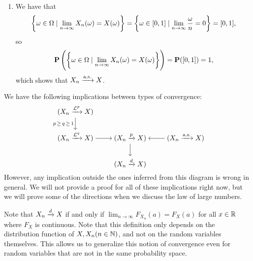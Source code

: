 \documentclass[11pt,a4paper]{article}
\newcommand{\as}{\text{a.s.}}
\begin{document}
\begin{example}
\begin{enumerate}
\begin{multline*}
        \lim_{n \to \infty} \E[|X_n - X|^p] =
        \lim_{n \to \infty} \E[X_n^p] =
        \lim_{n \to \infty} \int_{0}^{1/n} n y^p \dy \\ =
        \lim_{n \to \infty} \frac{n}{(p + 1) n^{p+1}} =
        \lim_{n \to \infty} \frac{1}{(p + 1) n^p} = 0.
      \end{multline*}
    \item[($X_n \taking{\as} X$)]
      We have that
      \[
        \left\{\omega \in \Omega \mid \lim_{n \to \infty}
          X_n(\omega) = X(\omega)\right\} =
        \left\{\omega \in [0,1] \mid
          \lim_{n \to \infty} \frac{\omega}{n} = 0\right\} =
          [0,1],
      \]
      so
      \[
        \Prob\del{\set{\omega \in \Omega \mid \lim_{n \to \infty}
          X_n(\omega) = X(\omega)}} =
        \Prob([0,1]) = 1,
      \]
      which shows that $X_n \taking{\as} X$.
  \end{enumerate}
\end{example}

\begin{remark}
  \label{rmk:diagram-of-convergence}
  We have the following implications between types of convergence:
  \[\begin{tikzcd}[ampersand replacement=\&,cramped]
    {(X_n \taking{\mathcal L^p} X)} \\
    {(X_n \taking{\mathcal L^q} X)} \& {(X_n \taking{p} X)} \& {(X_n \taking{\as} X)} \\
    \& {(X_n \taking{d} X)}
    \arrow["{p \,\geq\, q \,\geq\, 1}"', from=1-1, to=2-1]
    \arrow[from=2-1, to=2-2]
    \arrow[from=2-2, to=3-2]
    \arrow[from=2-3, to=2-2]
  \end{tikzcd}\]
  However, any implication outside the ones inferred from this
  diagram is wrong in general.
  We will not provide a proof for all of these implications right now,
  but we will prove some of the directions when we discuss
  the law of large numbers.
\end{remark}

\begin{remark}
  Note that $X_n \xrightarrow{d} X$ if and only if
  $\lim_{n \to \infty} F_{X_n}(a) = F_X(a)$ for all $x \in \mathbb{R}$
  where $F_X$ is continuous.
  Note that this definition only depends on the distribution function
  of $X,X_n(n \in \mathbb{N})$, and not on the random variables themselves.
  This allows us to generalize this notion of convergence
  even for random variables that are not in the same probability space.
\end{remark}
\end{document}
